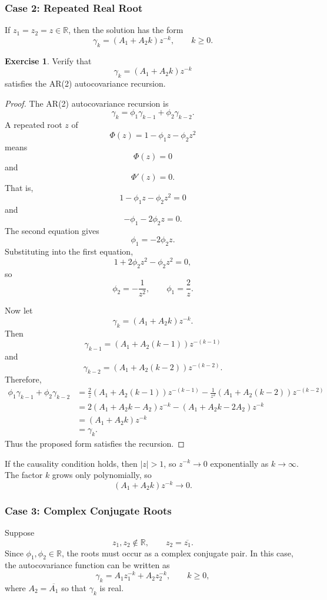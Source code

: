 \documentclass[12pt,oneside]{book}
\numberwithin{equation}{section}
\theoremstyle{definition}
\newtheorem{exercise}{Exercise}[section]
\theoremstyle{plain}
\theoremstyle{remark}
\newcommand{\R}{\mathbb{R}}
\begin{document}
\subsubsection{Case 2: Repeated Real Root}

If $z_1=z_2=z\in\R$, then the solution has the form
\[
\gamma_k
=
(A_1+A_2k)z^{-k},
\qquad k\geq 0.
\]

\begin{exercise}
Verify that
\[
\gamma_k=(A_1+A_2k)z^{-k}
\]
satisfies the AR(2) autocovariance recursion.
\end{exercise}

\begin{proof}
The AR(2) autocovariance recursion is
\[
\gamma_k=\phi_1\gamma_{k-1}+\phi_2\gamma_{k-2}.
\]
A repeated root $z$ of
\[
\Phi(z)=1-\phi_1z-\phi_2z^2
\]
means
\[
\Phi(z)=0
\]
and
\[
\Phi'(z)=0.
\]
That is,
\[
1-\phi_1z-\phi_2z^2=0
\]
and
\[
-\phi_1-2\phi_2z=0.
\]
The second equation gives
\[
\phi_1=-2\phi_2z.
\]
Substituting into the first equation,
\[
1+2\phi_2z^2-\phi_2z^2=0,
\]
so
\[
\phi_2=-\frac{1}{z^2},
\qquad
\phi_1=\frac{2}{z}.
\]

Now let
\[
\gamma_k=(A_1+A_2k)z^{-k}.
\]
Then
\[
\gamma_{k-1}=(A_1+A_2(k-1))z^{-(k-1)}
\]
and
\[
\gamma_{k-2}=(A_1+A_2(k-2))z^{-(k-2)}.
\]
Therefore,
\begin{align*}
\phi_1\gamma_{k-1}+\phi_2\gamma_{k-2}
&=
\frac{2}{z}(A_1+A_2(k-1))z^{-(k-1)}
-\frac{1}{z^2}(A_1+A_2(k-2))z^{-(k-2)} \\
&=
2(A_1+A_2k-A_2)z^{-k}
-
(A_1+A_2k-2A_2)z^{-k} \\
&=
(A_1+A_2k)z^{-k} \\
&=
\gamma_k.
\end{align*}
Thus the proposed form satisfies the recursion.
\end{proof}

If the causality condition holds, then $|z|>1$, so $z^{-k}\to 0$ exponentially as $k\to\infty$. The factor $k$ grows only polynomially, so
\[
(A_1+A_2k)z^{-k}\to 0.
\]

\subsubsection{Case 3: Complex Conjugate Roots}

Suppose
\[
z_1,z_2\notin\R,
\qquad
z_2=\overline{z_1}.
\]
Since $\phi_1,\phi_2\in\R$, the roots must occur as a complex conjugate pair. In this case, the autocovariance function can be written as
\[
\gamma_k
=
A_1z_1^{-k}+A_2z_2^{-k},
\qquad k\geq 0,
\]
where $A_2=\overline{A_1}$ so that $\gamma_k$ is real.
\end{document}
